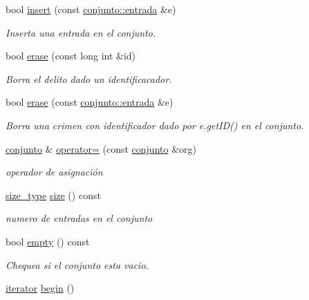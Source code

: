 \begin{DoxyCompactItemize}
bool \hyperlink{classconjunto_aa65b9f7c4cb9bad6d4e40c1973095930}{insert} (const \hyperlink{classconjunto_a09cad766dd65de73e51eae21f9d22585}{conjunto\-::entrada} \&e)
\begin{DoxyCompactList}\small\item\em Inserta una entrada en el conjunto. \end{DoxyCompactList}\item 
bool \hyperlink{classconjunto_ad550177fa4454da3a10fa356417e39a7}{erase} (const long int \&id)
\begin{DoxyCompactList}\small\item\em Borra el delito dado un identificacador. \end{DoxyCompactList}\item 
bool \hyperlink{classconjunto_a77a21ed91f1002f4eaed48d86535a874}{erase} (const \hyperlink{classconjunto_a09cad766dd65de73e51eae21f9d22585}{conjunto\-::entrada} \&e)
\begin{DoxyCompactList}\small\item\em Borra una crimen con identificador dado por e.\-get\-I\-D() en el conjunto. \end{DoxyCompactList}\item 
\hyperlink{classconjunto}{conjunto} \& \hyperlink{classconjunto_a2bdce402a4b76117b68fe71c0dffab87}{operator=} (const \hyperlink{classconjunto}{conjunto} \&org)
\begin{DoxyCompactList}\small\item\em operador de asignación \end{DoxyCompactList}\item 
\hyperlink{classconjunto_a855a5893bb0f5a851ab2dbf2b8aa6cc7}{size\-\_\-type} \hyperlink{classconjunto_a863e1e106e35adda47e7c5e2067295b9}{size} () const 
\begin{DoxyCompactList}\small\item\em numero de entradas en el conjunto \end{DoxyCompactList}\item 
bool \hyperlink{classconjunto_afcf4ff3ff3c1f83b63e901efebe93533}{empty} () const 
\begin{DoxyCompactList}\small\item\em Chequea si el conjunto esta vacio. \end{DoxyCompactList}\item 
\hypertarget{classconjunto_af90b2324c2675dd4751a79f2e2ad8277}{\hyperlink{classconjunto_1_1iterator}{iterator} \hyperlink{classconjunto_af90b2324c2675dd4751a79f2e2ad8277}{begin} ()}\label{classconjunto_af90b2324c2675dd4751a79f2e2ad8277}


\end{DoxyCompactItemize}
